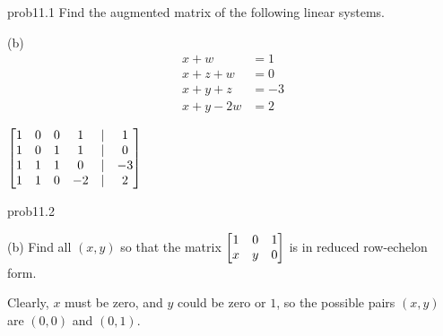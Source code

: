 
\begin{sol}{prob11.1} Find the augmented matrix of the following linear systems.
\medskip

(b) \begin{align*}
 x+w&=1\\
x+z+w&=0\\
x+y+z&=-3\\
x+y-2w&=2 
\end{align*}
\medskip

\soln $ 
\bmatrix 
1 & 0 & 0 & 1&|&1 \\
1 & 0 & 1 & 1&|&0 \\
1 & 1 & 1 & 0&|&-3 \\
1 & 1 & 0 & -2&|&2\endbmatrix$
% 


\end{sol}

\begin{sol}{prob11.2}
\medskip

(b) Find all $(x,y)$ so that the matrix $\bmatrix 1&0&1\cr
x&y&0\endbmatrix$ is in reduced row-echelon form.

\soln Clearly, $x$ must be zero, and $y$ could be zero or $1$, so the possible pairs $(x,y)$ are $(0,0)$ and $(0,1)$.
\medskip
%


\end{sol}